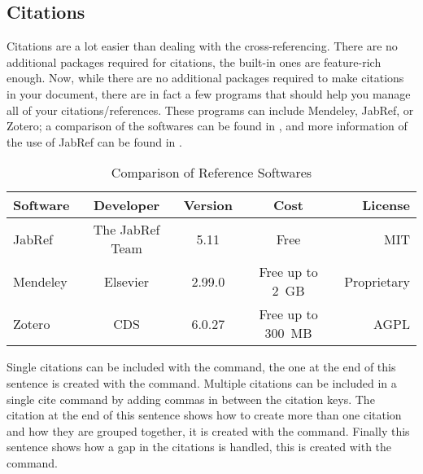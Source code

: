 		\subsection{Citations}\label{subsec:citations}
			Citations are a lot easier than dealing with the cross-referencing.
			There are no additional packages required for citations, the built-in ones are feature-rich enough.
			Now, while there are no additional packages required to make citations in your document, there are in fact a few programs that should help you manage all of your citations/references.
			These programs can include Mendeley, JabRef, or Zotero; a comparison of the softwares can be found in , and more information of the use of JabRef can be found in .
			\begin{table}[htbp]
				\centering
				\caption{Comparison of Reference Softwares}
				\label{tab:refSoftware}%
				\begin{tabularx}{0.95\linewidth}{Lcccr}
					\toprule
						Software & Developer         & Version & Cost                    & License \\
					\midrule
						JabRef   & The JabRef Team   & 5.11     & Free                    & MIT \\
						Mendeley & Elsevier          & 2.99.0   & {Free up to 2~GB}    & Proprietary \\
						Zotero   & CDS               & 6.0.27   & {Free  up to 300~MB} & AGPL  \\
					\bottomrule
				\end{tabularx}%
			\end{table}%
			Single citations can be included with the  command, the one at the end of this sentence is created with the  command\cite{TEST}. 
			Multiple citations can be included in a single cite command by adding commas in between the citation keys. 
			The citation at the end of this sentence shows how to create more than one citation and how they are grouped together, it is created with the  command\cite{testone,cite2,cite3,cite4,cite5}.
			Finally this sentence shows how a gap in the citations is handled, this is created with the  command\cite{testone,cite2,cite3,cite5}. 